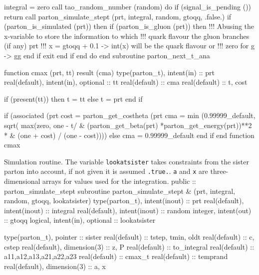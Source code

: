     integral = zero
    call tao_random_number (random)
    do
       if (signal_is_pending ()) return
       call parton_simulate_stept (prt, integral, random, gtoqq, .false.)
       if (parton_is_simulated (prt)) then
          if (parton_is_gluon (prt)) then
             !!! Abusing the x-variable to store the information to which
             !!! quark flavour the gluon branches (if any)
             prt%
             !!! x = gtoqq + 0.1 -> int(x) will be the quark flavour or
             !!! zero for g -> gg
          end if
          exit
       end if
    end do
  end subroutine parton_next_t_ana

\eatline
\nwendcode{}\nwdocspar
\nwenddocs{}\plusendmoddef
  function cmax (prt, tt) result (cma)
    type(parton_t), intent(in) :: prt
    real(default), intent(in), optional :: tt
    real(default) :: cma
    real(default) :: t, cost

    if (present(tt)) then
       t = tt
    else
       t = prt%
    end if

    if (associated (prt%
       cost = parton_get_costheta (prt%
       cma = min (0.99999_default, sqrt( max(zero, one - t/ &
              (parton_get_beta(prt) *parton_get_energy(prt))**2 * &
              (one + cost) / (one - cost))))
    else
       cma = 0.99999_default
    end if
  end function cmax

\eatline
\nwendcode{}Simulation routine. The variable {\tt{}lookatsister} takes constraints
from the sister parton into account, if not given it is assumed
{\tt{}.true.}. {\tt{}a} and {\tt{}x} are three-dimensional arrays for values
used for the integration.
\nwenddocs{}\plusendmoddef
  public :: parton_simulate_stept
\nwendcode{}\plusendmoddef
  subroutine parton_simulate_stept &
       (prt, integral, random, gtoqq, lookatsister)
    type(parton_t), intent(inout) :: prt
    real(default), intent(inout) :: integral
    real(default), intent(inout) :: random
    integer, intent(out) :: gtoqq
    logical, intent(in), optional :: lookatsister

    type(parton_t), pointer :: sister
    real(default) :: tstep, tmin, oldt
    real(default) :: c, cstep
    real(default), dimension(3) :: z, P
    real(default) :: to_integral
    real(default) :: a11,a12,a13,a21,a22,a23
    real(default) :: cmax_t
    real(default) :: temprand
    real(default), dimension(3) :: a, x

